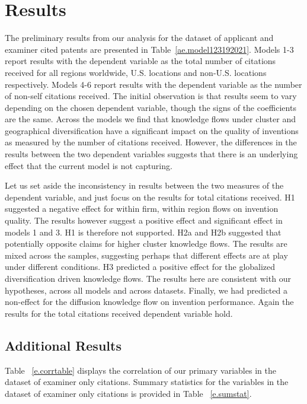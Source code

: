 \documentclass[12pt,letterpaper]{article}
\begin{document}





\section*{Results}
The preliminary results from our analysis for the dataset of applicant and examiner cited patents are presented in Table~\ref{ae.model123192021}. Models 1-3 report results with the dependent variable as the total number of citations received for all regions worldwide, U.S. locations and non-U.S. locations respectively. Models 4-6 report results with the dependent variable as the number of non-self citations received. The initial observation is that results seem to vary depending on the chosen dependent variable, though the signs of the coefficients are the same. Across the models we find that knowledge flows under cluster and geographical diversification have a significant impact on the quality of inventions as measured by the number of citations received. However, the differences in the results between the two dependent variables suggests that there is an underlying effect that the current model is not capturing. \par
Let us set aside the inconsistency in results between the two measures of the dependent variable, and just focus on the results for total citations received. H1 suggested a negative effect for within firm, within region flows on invention quality. The results however suggest a positive effect and significant effect in models 1 and 3. H1 is therefore not supported. H2a and H2b suggested that potentially opposite claims for higher cluster knowledge flows. The results are mixed across the samples, suggesting perhaps that different effects are at play under different conditions. H3 predicted a positive effect for the globalized diversification driven knowledge flows. The results here are consistent with our hypotheses, across all models and across datasets. Finally, we had predicted a non-effect for the diffusion knowledge flow on invention performance. Again the results for the total citations received dependent variable hold.  \par



\subsection{Additional Results}
Table ~\ref{e.corrtable} displays the correlation of our primary variables in the dataset of examiner only citations. Summary statistics for the variables in the dataset of examiner only citations is provided in Table ~\ref{e.sumstat}.
\end{document}
